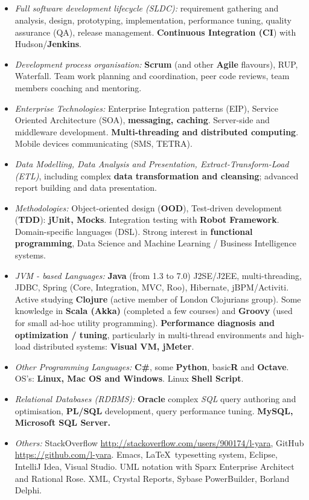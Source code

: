 \documentclass{res}
\begin{document}
\begin{resume}
\section{}
\vspace{15pt}
\begin{itemize}
  \item {\em Full software development lifecycle (SLDC):} requirement gathering and analysis, design, prototyping, implementation, performance tuning, quality assurance (QA), release management. {\bf Continuous Integration (CI}) with Hudson/{\bf Jenkins}.
  \item {\em Development process organisation:} {\bf Scrum} (and other {\bf Agile} flavours), RUP, Waterfall. Team work planning and coordination, peer code reviews, team members coaching and mentoring.
  \item {\em Enterprise Technologies:} Enterprise Integration patterns (EIP), Service Oriented Architecture (SOA), {\bf messaging, caching}. Server-side and middleware development. {\bf Multi-threading and distributed computing}. Mobile devices communicating (SMS, TETRA).
  \item {\em Data Modelling, Data Analysis and Presentation, Extract-Transform-Load (ETL)}, including complex {\bf data transformation and cleansing}; advanced report building and data presentation.
  \item {\em Methodologies:} Object-oriented design ({\bf OOD}), Test-driven development ({\bf TDD}): {\bf jUnit, Mocks}. Integration testing with {\bf Robot Framework}. Domain-specific languages (DSL). Strong interest in {\bf functional programming}, Data Science and Machine Learning / Business Intelligence systems.
  \item {\em JVM - based Languages:} {\bf Java} (from 1.3 to 7.0) J2SE/J2EE, multi-threading, JDBC, Spring (Core, Integration, MVC, Roo), Hibernate, jBPM/Activiti. Active studying {\bf Clojure} (active member of London Clojurians group). Some knowledge in {\bf Scala (Akka)} (completed a few courses) and {\bf Groovy} (used for small ad-hoc utility programming). {\bf Performance diagnosis and optimization / tuning}, particularly in multi-thread environments and high-load distributed systems: {\bf Visual VM, jMeter}.
  \item {\em Other Programming Languages:} {\bf C\#}, some {\bf Python}, basic{\bf R} and {\bf Octave}. OS’s: {\bf Linux, Mac OS and Windows}. Linux {\bf Shell Script}.
  \item {\em Relational Databases (RDBMS):} {\bf Oracle} complex {\em SQL} query authoring and optimisation, {\bf PL/SQL} development, query performance tuning. {\bf MySQL, Microsoft SQL Server.}
  \item {\em Others:} StackOverflow \url{http://stackoverflow.com/users/900174/l-yara}, GitHub \url{https://github.com/l-yara}. Emacs, \LaTeX ~typesetting system, Eclipse, IntelliJ Idea, Visual Studio. UML notation with Sparx Enterprise Architect and Rational Rose. XML, Crystal Reports, Sybase PowerBuilder, Borland Delphi.
\end{itemize}


\end{resume}
\end{document}
